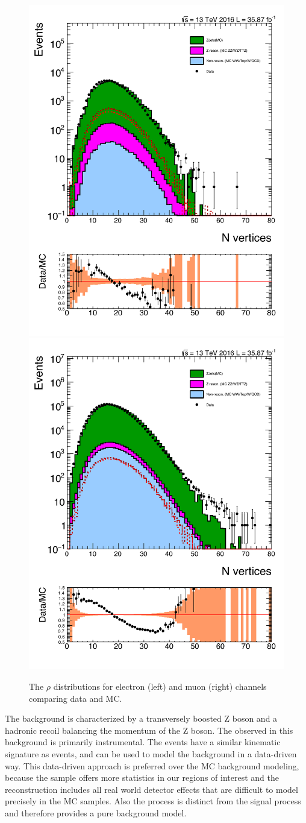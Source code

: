 \begin{figure}[htbp!]
\centering
\includegraphics[width=0.46\linewidth, page=2]{figures/ReMiniSummer16_MC_GMCPhPtWt_tightzpt50_puWeightsummer16_metfilter_unblind_el_log_1pb.pdf}
\includegraphics[width=0.46\linewidth, page=2]{figures/ReMiniSummer16_MC_GMCPhPtWt_tightzpt50_puWeightsummer16_metfilter_unblind_mu_log_1pb.pdf}
\caption{The $\rho$ distributions for electron (left) and muon (right) channels comparing data and MC.}
\label{fig:mc_rho}
\end{figure}

\vspace{0.3cm}
The \Zjets background is characterized by a transversely boosted Z boson and a hadronic recoil balancing the momentum of the Z boson. The observed \ptmiss in this background is primarily instrumental. The \gjets events have a similar kinematic signature as \Zjets events, and can be used to model the \Zjets background in a data-driven way. This \gjets data-driven approach is preferred over the MC background modeling, because the \gjets sample offers more statistics in our regions of interest and the \ptmiss reconstruction includes all real world detector effects that are difficult to model precisely in the MC samples. Also the \gjets process is distinct from the signal process and therefore provides a pure background model.

